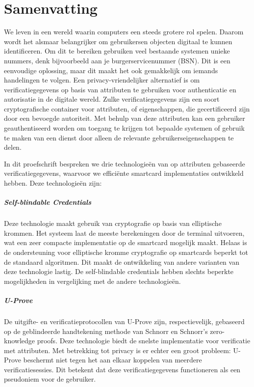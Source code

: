 \chapter*{Samenvatting}

We leven in een wereld waarin computers een steeds grotere rol spelen. Daarom 
wordt het alsmaar belangrijker om gebruikersen objecten digitaal te kunnen
identificeren. Om dit te bereiken gebruiken veel bestaande systemen unieke 
nummers, denk bijvoorbeeld aan je burgerservicenummer (BSN). Dit is een 
eenvoudige oplossing, maar dit maakt het ook gemakkelijk om iemands handelingen
te volgen. Een privacy-vriendelijker alternatief is om verificatiegegevens op 
basis van attributen te gebruiken voor authenticatie en autorisatie in de 
digitale wereld. Zulke verificatiegegevens zijn een soort cryptografische 
container voor attributen, of eigenschappen, die gecertificeerd zijn door een 
bevoegde autoriteit. Met behulp van deze attributen kan een gebruiker 
geauthentiseerd worden om toegang te krijgen tot bepaalde systemen of gebruik
te maken van een dienst door alleen de relevante gebruikerseigenschappen te 
delen.

In dit proefschrift bespreken we drie technologie\"{e}n van op attributen 
gebaseerde verificatiegegevens, waarvoor we effici\"{e}nte smartcard
implementaties ontwikkeld hebben. Deze technologie\"{e}n zijn:

\paragraph{Self-blindable Credentials}
Deze technologie maakt gebruik van cryptografie op basis van elliptische
krommen. Het systeem laat de meeste berekeningen door de terminal uitvoeren, 
wat een zeer compacte implementatie op de smartcard mogelijk maakt. Helaas is 
de ondersteuning voor elliptische kromme cryptografie op smartcards beperkt tot
de standaard algoritmen. Dit maakt de ontwikkeling van andere varianten van 
deze technologie lastig. De self-blindable credentials hebben slechts beperkte 
mogelijkheden in vergelijking met de andere technologie\"{e}n.

\paragraph{U-Prove}
De uitgifte- en verificatieprotocollen van U-Prove zijn, respectievelijk,
gebaseerd op de geblindeerde handtekening methode van Schnorr en Schnorr's 
zero-knowledge proofs. Deze technologie biedt de snelste implementatie voor 
verificatie met attributen. Met betrekking tot privacy is er echter een groot 
probleem: U-Prove beschermt niet tegen het aan elkaar koppelen van meerdere 
verificatiesessies. Dit betekent dat deze verificatiegegevens functioneren als
een pseudoniem voor de gebruiker.

